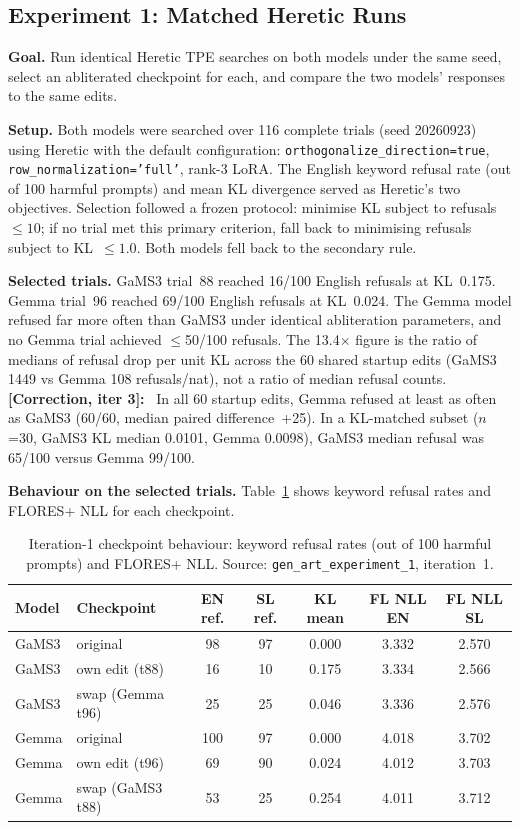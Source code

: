 \documentclass[11pt,letterpaper]{article}
\newcommand{\corr}[1]{\noindent\textbf{[Correction, iter #1]:}~}
\begin{document}
\subsection{Experiment 1: Matched Heretic Runs}\label{sec:exp1}

\textbf{Goal.} Run identical Heretic TPE searches on both models under the same seed, select an abliterated checkpoint for each, and compare the two models' responses to the same edits.

\textbf{Setup.} Both models were searched over 116 complete trials (seed 20260923) using Heretic with the default configuration: \texttt{orthogonalize\_direction=true}, \texttt{row\_normalization='full'}, rank-3 LoRA. The English keyword refusal rate (out of 100 harmful prompts) and mean KL divergence served as Heretic's two objectives. Selection followed a frozen protocol: minimise KL subject to refusals~$\leq10$; if no trial met this primary criterion, fall back to minimising refusals subject to KL~$\leq1.0$. Both models fell back to the secondary rule.

\textbf{Selected trials.} GaMS3 trial~88 reached 16/100 English refusals at KL~0.175. Gemma trial~96 reached 69/100 English refusals at KL~0.024. The Gemma model refused far more often than GaMS3 under identical abliteration parameters, and no Gemma trial achieved $\leq$50/100 refusals. The 13.4$\times$ figure is the ratio of medians of refusal drop per unit KL across the 60 shared startup edits (GaMS3 1449 vs Gemma 108 refusals/nat), not a ratio of median refusal counts. \corr{3} In all 60 startup edits, Gemma refused at least as often as GaMS3 (60/60, median paired difference~+25). In a KL-matched subset ($n$=30, GaMS3 KL median 0.0101, Gemma 0.0098), GaMS3 median refusal was 65/100 versus Gemma 99/100.

\textbf{Behaviour on the selected trials.} Table~\ref{tab:iter1_checkpoints} shows keyword refusal rates and FLORES+ NLL for each checkpoint.

\begin{table}[!htbp]
\centering
\caption{Iteration-1 checkpoint behaviour: keyword refusal rates (out of 100 harmful prompts) and FLORES+ NLL. Source: \texttt{gen\_art\_experiment\_1}, iteration~1.}
\label{tab:iter1_checkpoints}
\small
\begin{tabular}{llccccc}
\toprule
Model & Checkpoint & EN ref. & SL ref. & KL mean & FL NLL EN & FL NLL SL \\
\midrule
GaMS3 & original & 98 & 97 & 0.000 & 3.332 & 2.570 \\
GaMS3 & own edit (t88) & 16 & 10 & 0.175 & 3.334 & 2.566 \\
GaMS3 & swap (Gemma t96) & 25 & 25 & 0.046 & 3.336 & 2.576 \\
Gemma & original & 100 & 97 & 0.000 & 4.018 & 3.702 \\
Gemma & own edit (t96) & 69 & 90 & 0.024 & 4.012 & 3.703 \\
Gemma & swap (GaMS3 t88) & 53 & 25 & 0.254 & 4.011 & 3.712 \\
\bottomrule
\end{tabular}
\end{table}
\end{document}

